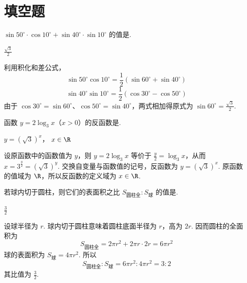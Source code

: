 \section{填空题}

\begin{problem}

\(\sin 50^{\circ} \cdot \cos 10^{\circ} + \sin 40^{\circ} \cdot \sin 10^{\circ}\) 的值是\fillinblank{}.
\end{problem}

\begin{answer}
\(\frac{\sqrt{3}}{2}\)
\end{answer}

\begin{solution}
利用积化和差公式，
\[
\sin50^{\circ}\cos10^{\circ}=\frac{1}{2}\left(\sin60^{\circ}+\sin40^{\circ}\right)
\]
\[
\sin40^{\circ}\sin10^{\circ}=\frac{1}{2}\left(\cos30^{\circ}-\cos50^{\circ}\right)
\]
由于 \(\cos30^{\circ}=\sin60^{\circ}\)、\(\cos50^{\circ}=\sin40^{\circ}\)，两式相加得原式为 \(\sin60^{\circ}=\frac{\sqrt{3}}{2}\).
\end{solution}


\begin{problem}

函数 \(y = 2\log_3 x \)（\(x > 0 \)）的反函数是\fillinblank{}.
\end{problem}

\begin{answer}
\(y = (\sqrt{3})^x\)， \(x \in \R\)
\end{answer}

\begin{solution}
设原函数中的函数值为 \(y\)，则 \(y=2\log_3x\) 等价于 \(\frac{y}{2}=\log_3x\)，从而 \(x=3^{\frac{y}{2}}=(\sqrt{3})^y\). 交换自变量与函数值的记号，反函数为 \(y=(\sqrt{3})^x\). 原函数的值域为 \(\R\)，所以反函数的定义域为 \(x\in\R\).
\end{solution}


\begin{problem}

若球内切于圆柱，则它们的表面积之比 \(S_{\text{圆柱全}}: S_{\text{球}}\) 的值是\fillinblank{}.
\end{problem}

\begin{answer}
\(\frac{3}{2}\)
\end{answer}

\begin{solution}
设球半径为 \(r\). 球内切于圆柱意味着圆柱底面半径为 \(r\)，高为 \(2r\). 因而圆柱的全面积为
\[
S_{\text{圆柱全}}=2\pi r^2+2\pi r\cdot2r=6\pi r^2
\]
球的表面积为 \(S_{\text{球}}=4\pi r^2\). 所以
\[
S_{\text{圆柱全}}:S_{\text{球}}=6\pi r^2:4\pi r^2=3:2
\]
其比值为 \(\frac{3}{2}\).
\end{solution}


